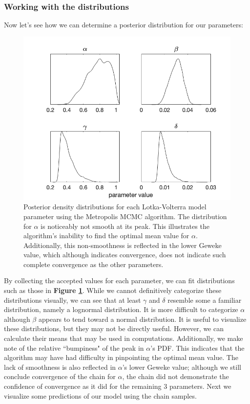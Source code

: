 \documentclass{article}
\begin{document}
\subsubsection{Working with the distributions}
\par Now let's see how we can determine a posterior distribution for our parameters:
\begin{figure}[H]
    \centering
    \includegraphics[width=15cm]{MCMC_figs/met_lv_final/final_mh_den.png}
    \caption{Posterior density distributions for each Lotka-Volterra model parameter using the Metropolis MCMC algorithm. The distribution for $\alpha$ is noticeably not smooth at its peak. This illustrates the algorithm's inability to find the optimal mean value for $\alpha$. Additionally, this non-smoothness is reflected in the lower Geweke value, which although indicates convergence, does not indicate such complete convergence as the other parameters.}
    \label{fig:4mcmc}
\end{figure}
By collecting the accepted values for each parameter, we can fit distributions such as those in \textbf{Figure \ref{fig:4mcmc}}. While we cannot definitively categorize these distributions visually, we can see that at least $\gamma$ and $\delta$ resemble some a familiar distribution, namely a lognormal distribution. It is more difficult to categorize $\alpha$ although $\beta$ appears to tend toward a normal distribution. It is useful to visualize these distributions, but they may not be directly useful. However, we can calculate their means that may be used in computations. Additionally, we make note of the relative ``bumpiness" of the peak in $\alpha$'s PDF. This indicates that the algorithm may have had difficulty in pinpointing the optimal mean value. The lack of smoothness is also reflected in $\alpha$'s lower Geweke value; although we still conclude convergence of the chain for $\alpha$, the chain did not demonstrate the confidence of convergence as it did for the remaining 3 parameters. Next we visualize some predictions of our model using the chain samples.
\end{document}
